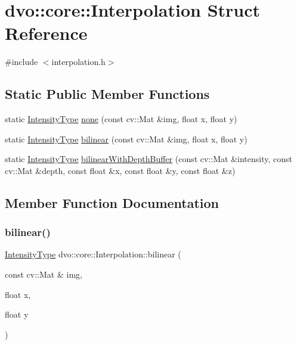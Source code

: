 \hypertarget{structdvo_1_1core_1_1_interpolation}{}\section{dvo\+:\+:core\+:\+:Interpolation Struct Reference}
\label{structdvo_1_1core_1_1_interpolation}


{\ttfamily \#include $<$interpolation.\+h$>$}

\subsection*{Static Public Member Functions}
\begin{DoxyCompactItemize}
\item 
static \mbox{\hyperlink{namespacedvo_1_1core_a59740d7c1f271a6ec8cb2b5c42e7a3f2}{Intensity\+Type}} \mbox{\hyperlink{structdvo_1_1core_1_1_interpolation_a5ea50138a3a09dbbbc056e2b67526dfd}{none}} (const cv\+::\+Mat \&img, float x, float y)
\item 
static \mbox{\hyperlink{namespacedvo_1_1core_a59740d7c1f271a6ec8cb2b5c42e7a3f2}{Intensity\+Type}} \mbox{\hyperlink{structdvo_1_1core_1_1_interpolation_afa685d096b310ee18ec6e5491d2a80d6}{bilinear}} (const cv\+::\+Mat \&img, float x, float y)
\item 
static \mbox{\hyperlink{namespacedvo_1_1core_a59740d7c1f271a6ec8cb2b5c42e7a3f2}{Intensity\+Type}} \mbox{\hyperlink{structdvo_1_1core_1_1_interpolation_a25af1de0ec0b6547e9f06b70abb18e0b}{bilinear\+With\+Depth\+Buffer}} (const cv\+::\+Mat \&intensity, const cv\+::\+Mat \&depth, const float \&x, const float \&y, const float \&z)
\end{DoxyCompactItemize}


\subsection{Member Function Documentation}
\mbox{\label{structdvo_1_1core_1_1_interpolation_afa685d096b310ee18ec6e5491d2a80d6}} 
\subsubsection{\texorpdfstring{bilinear()}{bilinear()}}
{\footnotesize\ttfamily \mbox{\hyperlink{namespacedvo_1_1core_a59740d7c1f271a6ec8cb2b5c42e7a3f2}{Intensity\+Type}} dvo\+::core\+::\+Interpolation\+::bilinear (\begin{DoxyParamCaption}\item[{const cv\+::\+Mat \&}]{img,  }\item[{float}]{x,  }\item[{float}]{y }\end{DoxyParamCaption})\hspace{0.3cm}{\ttfamily [static]}}

